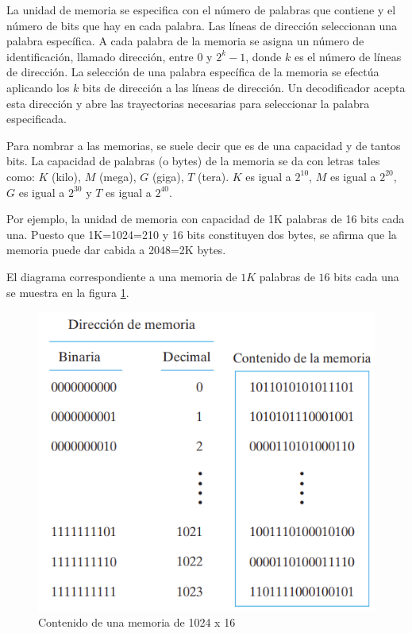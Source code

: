 La unidad de memoria se especifica con el número de palabras que contiene y el número de bits que hay en cada palabra. Las líneas de dirección seleccionan una palabra específica. A cada palabra de la memoria se asigna un número de identificación, llamado dirección, entre $0$ y $2^k -1$, donde $k$ es el número de líneas de dirección. La selección de una palabra específica de la memoria se efectúa aplicando los $k$ bits de dirección a las líneas de dirección. Un decodificador acepta esta dirección y abre las trayectorias necesarias para seleccionar la palabra especificada.

Para nombrar a las memorias, se suele decir que es de una capacidad y de tantos bits. La capacidad de palabras (o bytes) de la memoria se da con letras tales como: $K$ (kilo), $M$ (mega), $G$ (giga), $T$ (tera). $K$ es igual a $2^{10}$, $M$ es igual a $2^{20}$, $G$ es igual a $2^{30}$ y $T$ es igual a $2^{40}$.

\begin{mdframed}[backgroundcolor=gray!10,linewidth=0]
    Por ejemplo, la unidad de memoria con capacidad de 1K palabras de 16 bits cada una. Puesto que 1K=1024=210 y 16 bits constituyen dos bytes, se afirma que la memoria puede dar cabida a 2048=2K bytes.
\end{mdframed}

\newpage
El diagrama correspondiente a una memoria de $1K$ palabras de $16$ bits cada una se muestra en la figura \ref{fig:memfoto}.
\begin{figure}[h]
\centering
\includegraphics[scale=0.7]{img/ejem.png}
\caption{Contenido de una memoria de 1024 x 16}
\label{fig:memfoto}
\end{figure}


